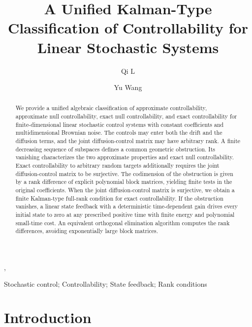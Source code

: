 \documentclass[twocolumn]{autart}
\begin{document}
\begin{frontmatter}
\title{A Unified Kalman-Type Classification of Controllability for Linear Stochastic Systems}
\author[scu]{Qi L},
\author[swjtu]{Yu Wang}
\address[scu]{School of Mathematics, Sichuan University, Chengdu 610064, China}
\address[swjtu]{School of Mathematics, Southwest Jiaotong University, Chengdu 611756, China}
\begin{keyword}
Stochastic control; Controllability;
State feedback; Rank conditions
\end{keyword}
\begin{abstract}
We provide a unified algebraic classification of approximate controllability,
approximate null controllability, exact null controllability, and exact
controllability for finite-dimensional linear stochastic control systems with
constant coefficients and multidimensional Brownian noise. The controls may
enter both the drift and the diffusion terms, and the joint diffusion-control
matrix may have arbitrary rank. A finite decreasing sequence of subspaces
defines a common geometric obstruction. Its vanishing characterizes the two
approximate properties and exact null controllability. Exact controllability to
arbitrary random targets additionally requires the joint diffusion-control
matrix to be surjective. The codimension of the obstruction is given by a rank
difference of explicit polynomial block matrices, yielding finite tests in the
original coefficients. When the joint diffusion-control matrix is surjective,
we obtain a finite Kalman-type full-rank condition for exact controllability.
If the obstruction vanishes, a linear state feedback with a deterministic
time-dependent gain drives every initial state to zero at any prescribed positive time with finite energy and
polynomial small-time cost. An equivalent orthogonal elimination algorithm
computes the rank differences, avoiding
exponentially large block matrices.
\end{abstract}
\end{frontmatter}
\setlength{\parskip}{2pt plus 1pt minus 1pt}
\setlength{\parindent}{1em}

\section{Introduction}\label{sec:intro}
\end{document}

